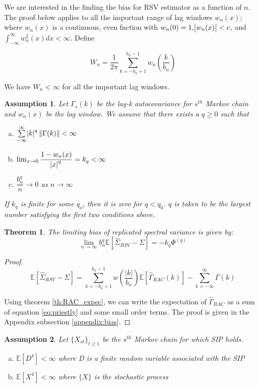 \documentclass[12pt]{article}
\newtheorem{theorem}{Theorem}
\newcommand{\E}{\mathbb{E}}
\newtheorem{ass}{Assumption}
\begin{document}
\bigskip

We are interested in the finding the bias for RSV estimator as a function of $n$. The proof below applies to all the important range of lag windows $w_n(x)$; where $w_n(x)$ is a continuous, even fnction with $w_n(0)=1, \abs{w_n(x)} < c$, and $\int_{-\infty}^{\infty}w_n^2(x)dx < \infty$. Define

\[
W_n = \dfrac{1}{2\pi}\sum_{k=-b_n+1}^{b_n-1}w_n\left(\dfrac{k}{b_n}\right)
\]

We have $W_n < \infty$ for all the important lag windows.

\begin{ass} \label{ass:bias}
    Let $\Gamma_s(k)$ be the lag-k autocovariance for $s^{th}$ Markov chain and $w_n(x)$ be the lag window. We assume that there exists a $q \geq 0$ such that
    \begin{enumerate} [a.]
        \item $\sum\limits_{-\infty}^{\infty}\abs{k}^q \|\Gamma(k)\| < \infty$
        \item $\lim _{x \to 0}\dfrac{1 - w_n(x)}{\abs{x}^q} = k_q < \infty$
        \item $\dfrac{b_n^q}{n} \to 0$ as $n \to \infty$
    \end{enumerate}
    
    If $k_q$ is finite for some $q_o$, then it is zero for $q < q_0$. $q$ is taken to be the largest number satisfying the first two conditions above.
\end{ass}


\begin{theorem}\label{th:rsv_bias}
The limiting bias of replicated spectral variance is given by:
\[
 \lim_{n \to \infty}b_n^q\mathbb{E}[\hat{\Sigma}_{RSV} - \Sigma] = -k_q\Phi^{(q)}
 \]
\end{theorem}

\begin{proof}

\[
\mathbb{E}[\hat{\Sigma}_{RSV} - \Sigma] = \sum_{k=-b_n+1}^{b_n-1} w\left(\dfrac{|k|}{b_n}\right)\mathbb{E}[\hat{\Gamma}_{RAC}(k)]-\sum_{k=-\infty}^{\infty}\Gamma(k)
\]

Using theorem \ref{th:RAC_expec}, we can write the expectation of $\hat{\Gamma}_{RAC}$ as  a sum of equation \ref{eq:priestly} and some small order terms.
The proof is given in the Appendix subsection \ref{appendix:bias}.
\end{proof}


\begin{ass} \label{ass:variance_cal}
Let $\{X_{st}\}_{t \geq 1}$ be the $s^{th}$ Markov chain for which SIP holds. 
\begin{enumerate}[a.]
    \item $\E[D^4] < \infty$ where D is a finite random variable associated with the SIP
    \item $\E[X^4] < \infty$ where $\{X\}$ is the stochastic process
\end{enumerate}
\end{ass}
\end{document}
